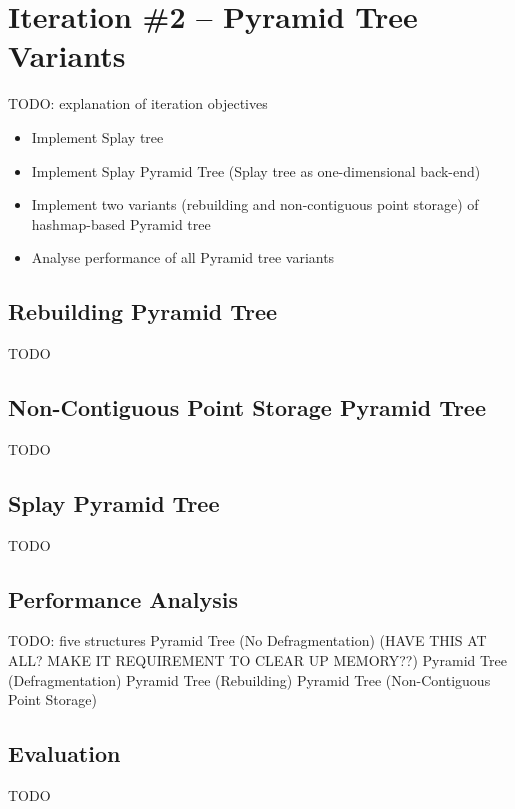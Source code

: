\section{Iteration \#2 -- Pyramid Tree Variants}

TODO: explanation of iteration objectives
\begin{itemize}
	\item Implement Splay tree
	\item Implement Splay Pyramid Tree (Splay tree as one-dimensional back-end)
	\item Implement two variants (rebuilding and non-contiguous point storage) of hashmap-based Pyramid tree 
	\item Analyse performance of all Pyramid tree variants
\end{itemize}

\subsection{Rebuilding Pyramid Tree}

TODO

\subsection{Non-Contiguous Point Storage Pyramid Tree}

TODO

\subsection{Splay Pyramid Tree}

TODO

\subsection{Performance Analysis}

TODO: five structures
	Pyramid Tree (No Defragmentation) (HAVE THIS AT ALL? MAKE IT REQUIREMENT TO CLEAR UP MEMORY??)
	Pyramid Tree (Defragmentation)
	Pyramid Tree (Rebuilding)
	Pyramid Tree (Non-Contiguous Point Storage)

\subsection{Evaluation}

TODO
